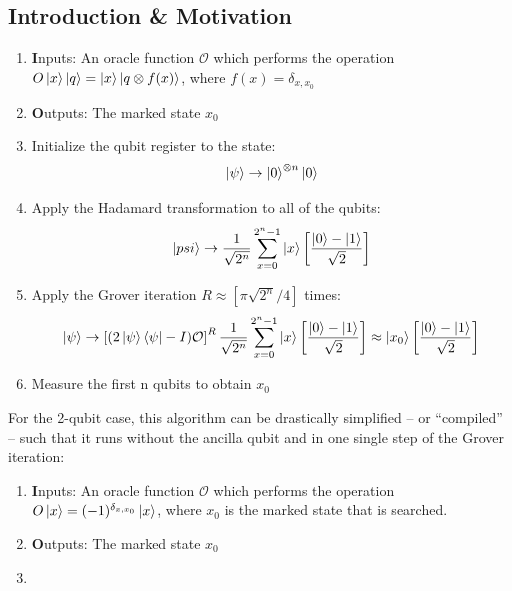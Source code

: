 \subsection{Introduction \& Motivation}

\begin{enumerate}
  \item {\textbf Inputs:} An oracle function $\mathcal{O}$ which performs the operation $O\left| x \right>\left| q \right> = \left| x \right>\left| q\otimes f(x) \right>$, where $f(x) = \delta_{x,x_0}$
  \item {\textbf Outputs:} The marked state $x_0$
	\item Initialize the qubit register to the state: 
	$$\left| \psi \right> \to \left| 0 \right>^{\otimes n}\left| 0 \right>$$
	\item Apply the Hadamard transformation to all of the qubits: 
	$$\left| psi \right>\to \frac{1}{\sqrt{2^n}}\sum\limits_{x=0}^{2^n-1} \left| x \right> \left[ \frac{\left| 0 \right>-\left| 1 \right>}{\sqrt{2}} \right]$$
	\item Apply the Grover iteration $R \approx [\pi \sqrt{2^n}/4]$ times:
	$$ \left| \psi \right> \to \left[(2 \left| \psi \right>\left< \psi \right|-I)\mathcal{O}\right]^R \frac{1}{\sqrt{2^n}} \sum\limits_{x=0}^{2^n-1}\left| x \right> \left[ \frac{\left| 0 \right>-\left| 1 \right>}{\sqrt{2}} \right] \approx \left| x_0 \right>\left[\frac{\left| 0 \right>-\left| 1 \right>}{\sqrt{2}}\right] $$
	\item Measure the first n qubits to obtain $x_0$
\end{enumerate}

For the 2-qubit case, this algorithm can be drastically simplified -- or ``compiled'' -- such that it runs without the ancilla qubit and in one single step of the Grover iteration:

\begin{enumerate}
  \item {\textbf Inputs:} An oracle function $\mathcal{O}$ which performs the operation $O\left| x \right> =(-1)^{\delta_{x,x_0}}\left| x \right>$, where $x_0$ is the marked state that is searched.
  \item {\textbf Outputs:} The marked state $x_0$
	\item 
\end{enumerate}


